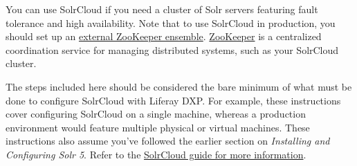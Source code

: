 You can use SolrCloud if you need a cluster of Solr servers featuring
fault tolerance and high availability. Note that to use SolrCloud in
production, you should set up an
\href{https://cwiki.apache.org/confluence/display/solr/Setting+Up+an+External+ZooKeeper+Ensemble}{external
ZooKeeper ensemble}. \href{http://zookeeper.apache.org/}{ZooKeeper} is a
centralized coordination service for managing distributed systems, such
as your SolrCloud cluster.

The steps included here should be considered the bare minimum of what
must be done to configure SolrCloud with Liferay DXP. For example, these
instructions cover configuring SolrCloud on a single machine, whereas a
production environment would feature multiple physical or virtual
machines. These instructions also assume you've followed the earlier
section on \emph{Installing and Configuring Solr 5}. Refer to the
\href{https://cwiki.apache.org/confluence/display/solr/SolrCloud}{SolrCloud
guide for more information}.

